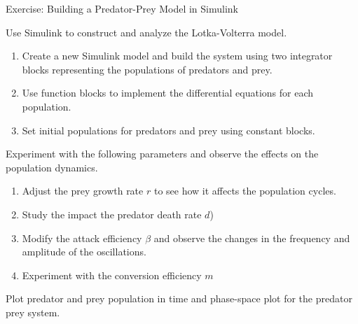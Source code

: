 \begin{frame}{Exercise: Building a Predator-Prey Model in Simulink}
\small

        Use Simulink to construct and analyze the Lotka-Volterra model.


        \begin{enumerate}
        \footnotesize
            \item Create a new Simulink model and build the system using two integrator blocks representing the populations of predators and prey.
            \item Use function blocks to implement the differential equations for each population.
            \item Set initial populations for predators and prey using constant blocks.
        \end{enumerate}
        Experiment with the following parameters and observe the effects on the population dynamics. 
 \begin{enumerate}
     \footnotesize
            \item Adjust the prey growth rate $r$ to see how it affects the population cycles.
            \item Study the impact the predator death rate $d$)
            \item Modify the attack efficiency $\beta$ and observe the changes in the frequency and amplitude of the oscillations.
            \item Experiment with the conversion efficiency $m$
             \end{enumerate}

    Plot predator and prey population in time and phase-space plot for the predator prey system.

\end{frame}

